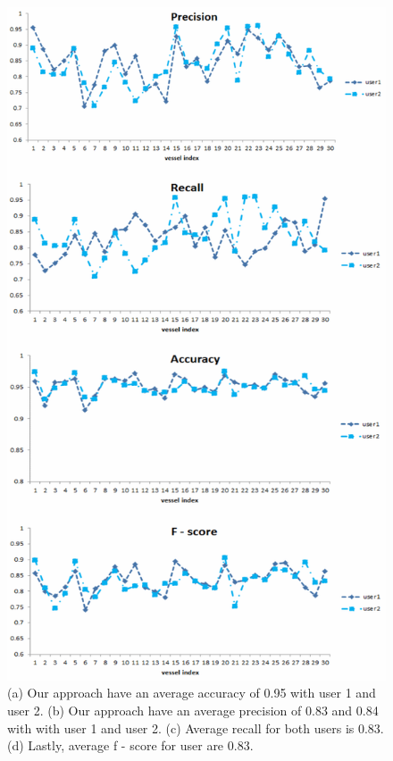  \begin{figure}[H] \centering
 \begin{center}
    \includegraphics[scale=0.45]{figure/isvSegResult.png}
  \end{center}
  \caption[Comparison between the automated segmentation and manual segmentation of ISV.]{(a) Our approach have an average accuracy of 0.95 with user 1 and user 2. (b) Our approach have an average precision of 0.83 and 0.84 with with user 1 and user 2. (c) Average recall for both users is 0.83. (d) Lastly, average f - score for user are 0.83.}
 \label{segResult}
\end{figure}

